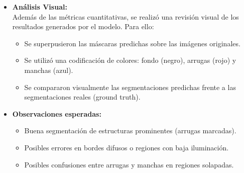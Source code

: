 \begin{enumerate}
\begin{itemize}
\begin{itemize}
\begin{itemize}
    \end{itemize}
  
    \item \textbf{Análisis Visual:}\\
    Además de las métricas cuantitativas, se realizó una revisión visual de los resultados generados por el modelo. Para ello:
    \begin{itemize}
      \item Se superpusieron las máscaras predichas sobre las imágenes originales.
      \item Se utilizó una codificación de colores: fondo (negro), arrugas (rojo) y manchas (azul).
      \item Se compararon visualmente las segmentaciones predichas frente a las segmentaciones reales (ground truth).
    \end{itemize}
  
    \item \textbf{Observaciones esperadas:}
    \begin{itemize}
      \item Buena segmentación de estructuras prominentes (arrugas marcadas).
      \item Posibles errores en bordes difusos o regiones con baja iluminación.
      \item Posibles confusiones entre arrugas y manchas en regiones solapadas.
    \end{itemize}
  \end{itemize}


\end{itemize}
\end{enumerate}
